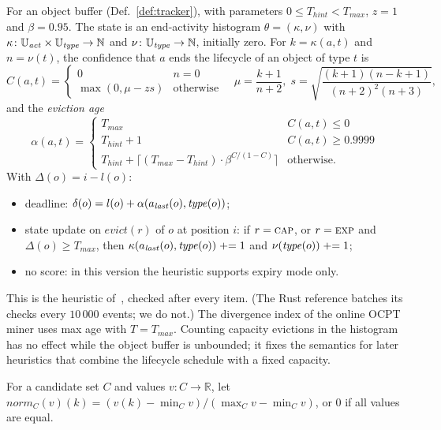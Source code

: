 \begin{definition}\label{def:lifecycle}
For an object buffer (Def.~\ref{def:tracker}), with parameters
$0 \le T_{\mathit{hint}} < T_{\mathit{max}}$,
$z = 1$ and $\beta = 0.95$.
The state is an end-activity histogram $\theta = (\kappa, \nu)$ with
$\kappa \colon \mathbb{U}_{\mathit{act}} \times \mathbb{U}_{\mathit{type}} \to \mathbb{N}$ and
$\nu \colon \mathbb{U}_{\mathit{type}} \to \mathbb{N}$, initially zero.
For $k = \kappa(a,t)$ and $n = \nu(t)$, the confidence that $a$ ends the
lifecycle of an object of type $t$ is
\[
  C(a,t) = \begin{cases}
    0 & n = 0\\
    \max(0, \mu - z s) & \text{otherwise}
  \end{cases}
  \quad
  \mu = \frac{k+1}{n+2},\;
  s = \sqrt{\frac{(k+1)(n-k+1)}{(n+2)^2(n+3)}},
\]
and the \emph{eviction age}
\[
  \alpha(a,t) = \begin{cases}
    T_{\mathit{max}} & C(a,t) \le 0\\
    T_{\mathit{hint}} + 1 & C(a,t) \ge 0.9999\\
    T_{\mathit{hint}} + \bigl\lceil (T_{\mathit{max}} - T_{\mathit{hint}}) \cdot \beta^{C/(1-C)} \bigr\rceil & \text{otherwise.}
  \end{cases}
\]
With $\Delta(o) = i - l(o)$:
\begin{itemize}
  \item deadline: $\delta(o) = l(o) + \alpha(a_{\mathit{last}}(o), \mathit{type}(o))$;
  \item state update on $\mathit{evict}(r)$ of $o$ at position $i$: if
        $r = \textsc{cap}$, or $r = \textsc{exp}$ and $\Delta(o) \ge T_{\mathit{max}}$, then
        $\kappa(a_{\mathit{last}}(o), \mathit{type}(o)) \mathrel{+}= 1$ and
        $\nu(\mathit{type}(o)) \mathrel{+}= 1$;
  \item no score: in this version the heuristic supports expiry mode only.
\end{itemize}
\end{definition}

This is the heuristic of~\cite{Muehlmeyer2026}, checked after every item.
(The Rust reference batches its checks every $10\,000$ events; we do not.)
The divergence index of the online OCPT miner uses max age with
$T = T_{\mathit{max}}$.
Counting capacity evictions in the histogram has no effect while the object
buffer is unbounded; it fixes the semantics for later heuristics that combine
the lifecycle schedule with a fixed capacity.

For a candidate set $C$ and values $v \colon C \to \mathbb{R}$, let
$\mathit{norm}_C(v)(k) = (v(k) - \min_C v) / (\max_C v - \min_C v)$, or $0$ if
all values are equal.

